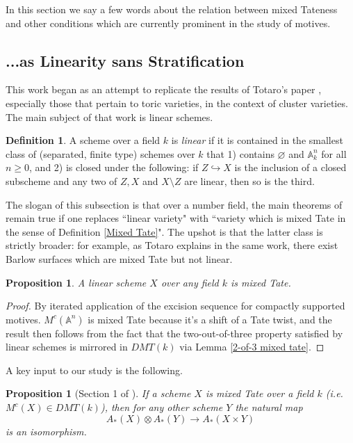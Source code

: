\documentclass[11pt]{amsart}
\newtheorem{prop}[thm]{Proposition}
\theoremstyle{definition}
\newtheorem{defn}[thm]{Definition}
\theoremstyle{remark}
\renewcommand{\emptyset}{\varnothing}
\numberwithin{equation}{section}
\begin{document}
In this section we say a few words about the relation between mixed Tateness and other conditions which are currently prominent in the study of motives.

\subsection{...as Linearity sans Stratification}\label{subsection 3.1}

This work began as an attempt to replicate the results of Totaro's paper \cite{totaro2014chow}, especially those that pertain to toric varieties, in the context of cluster varieties. The main subject of that work is linear schemes.

\begin{defn}
    A scheme over a field $k$ is \textit{linear} if it is contained in the smallest class of (separated, finite type) schemes over $k$ that 1) contains $\emptyset$ and $\mathbb{A}^n_k$ for all $n \geq 0$, and 2) is closed under the following: if $Z \hookrightarrow X$ is the inclusion of a closed subscheme and any two of $Z, X$ and $X \setminus Z$ are linear, then so is the third.
\end{defn}

The slogan of this subsection is that over a number field, the main theorems of \cite{totaro2014chow} remain true if one replaces ``linear variety" with ``variety which is mixed Tate in the sense of Definition \ref{Mixed Tate}". The upshot is that the latter class is strictly broader: for example, as Totaro explains in the same work, there exist Barlow surfaces which are mixed Tate but not linear.

\begin{prop}\label{linear implies MT}
   A linear scheme $X$ over any field $k$ is mixed Tate.
\end{prop}

\begin{proof}
    By iterated application of the excision sequence for compactly supported motives. $M^c(\mathbb{A}^n)$ is mixed Tate because it's a shift of a Tate twist, and the result then follows from the fact that the two-out-of-three property satisfied by linear schemes is mirrored in $DMT(k)$ via Lemma \ref{2-of-3 mixed tate}.
\end{proof}

A key input to our study is the following.

\begin{prop}[Section 1 of \cite{totaro2016motive}]\label{strong CKgP}
    If a scheme $X$ is mixed Tate over a field $k$ (i.e. $M^c(X) \in DMT(k)$), then for any other scheme $Y$ the natural map \begin{equation}
        A_*(X) \otimes A_*(Y) \rightarrow A_*(X \times Y) \end{equation} \noindent is an isomorphism.
\end{prop}
\end{document}

